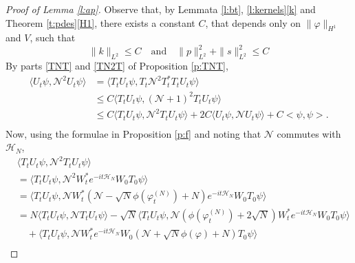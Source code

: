 \documentclass[11pt,a4paper,DIV11]{scrartcl}	%
\newcommand{\N}{\mathcal{N}}
\newcommand{\scal}[2]{\big<#1,#2\big>} %
\newcommand{\ph}{\varphi_t^{(N)}}	%
\begin{document}
\begin{proof}[Proof of Lemma \ref{l:ap}]
  Observe that, by Lemmata \ref{l:bt}, \ref{l:kernels}\ref{k} and Theorem
  \ref{t:pdes}\eqref{H1}, there exists a constant $C$, %
  that depends only on $\| \varphi \|_{H^1}$ and $V$, such that
  \begin{equation} \label{c2}
      \| k \|_{L^2} \le C %
\quad\text{and}\quad
      \| p \|_{L^2}^2 + \| s \|_{L^2}^2 \le C%
  \end{equation}
  By parts \eqref{TNT} and \eqref{TN2T} of Proposition \ref{p:TNT},
  \begin{equation}
    \label{ep4}
    \begin{split}
      \langle U_t \psi, \N^2 U_t \psi \rangle & = \langle T_t U_t \psi, T_t
      \N^2 T_t^* T_t U_t \psi \rangle \\
      & \le C \langle T_t U_t \psi, (\N+1)^2 T_t U_t \psi \rangle \\
      & \le C \langle T_t U_t \psi, \N^2 T_t U_t \psi \rangle + 2 C \langle
      U_t \psi, \N U_t \psi \rangle + C\scal{\psi}{\psi}. \\
    \end{split}
  \end{equation} 
  Now, using the formulae in Proposition \ref{p:f} and noting that $\N$
  commutes with $\mathcal{H}_N$,
  \begin{align*}
    & \langle T_t U_t \psi, \N^2 T_t U_t \psi \rangle \\
    & = \langle T_t U_t \psi, \N^2 W_t^* e^{-it \mathcal{H}_N} W_0 T_0 \psi \rangle
    \\
    & = \langle T_t U_t \psi, \N W_t^* \left(\N - \sqrt{N} \phi(\ph) + N\right)
    e^{-it \mathcal{H}_N} W_0 T_0 \psi \rangle \\
    & = N \langle T_t U_t \psi, \N T_t U_t \psi \rangle - \sqrt{N} \langle T_t
    U_t \psi, \N \left( \phi(\ph) + 2\sqrt{N}\right) W_t^* e^{-it\mathcal{H}_N} W_0 T_0 
    \psi \rangle \\
    & \quad + \langle T_t U_t \psi, \N W_t^* e^{-it\mathcal{H}_N} W_0 \left(\N +
    \sqrt{N} \phi(\varphi) + N\right) T_0 \psi \rangle \\

\end{align*}
\end{proof}
\end{document}
